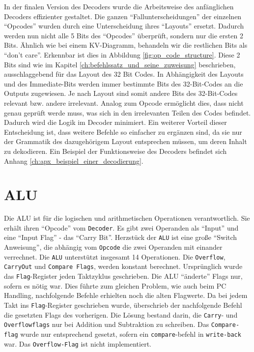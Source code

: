 \documentclass[paper=a4,fontsize=11pt,twocolumn]{scrreprt}
\begin{document}
In der finalen Version des Decoders wurde die Arbeitsweise des anfänglichen Decoders effizienter gestaltet.
Die ganzen \enquote{Fallunterscheidungen} der einzelnen \enquote{Opcodes} wurden durch eine Unterscheidung ihres \enquote{Layouts} ersetzt.
Dadurch werden nun nicht alle 5 Bits des \enquote{Opcodes} überprüft, sondern nur die ersten 2 Bits.
Ähnlich wie bei einem KV-Diagramm, behandeln wir die restlichen Bits als \enquote{don't care}.
Erkennbar ist dies in Abbildung \ref{fig:op_code_structure}.
Diese 2 Bits sind wie im Kapitel \ref{ch:befehlssatz_und_seine_zuweisung} beschrieben, ausschlaggebend für das Layout des 32 Bit Codes.
In Abhängigkeit des Layouts und des Immediate-Bits werden immer bestimmte Bits des 32-Bit-Codes an die Outputs zugewiesen.
Je nach Layout sind somit andere Bits des 32-Bit-Codes relevant bzw. andere irrelevant.
Analog zum Opcode ermöglicht dies, dass nicht genau geprüft werde muss, was sich in den irrelevanten Teilen des Codes befindet.
Dadurch wird die Logik im Decoder minimiert. 
Ein weiterer Vorteil dieser Entscheidung ist, dass weitere Befehle so einfacher zu ergänzen sind, da sie nur der Grammatik des dazugehörigem Layout entsprechen müssen, um deren Inhalt zu dekodieren.
Ein Beispiel der Funktionsweise des Decoders befindet sich Anhang \ref{ch:apx_beispiel_einer_decodierung}.

\section{ALU}
\label{sec:alu}

Die ALU ist für die logischen und arithmetischen Operationen verantwortlich.
Sie erhält ihren \enquote{Opcode} vom \texttt{Decoder}.
Es gibt zwei Operanden als \enquote{Input} und eine \enquote{Input Flag} - das \enquote{Carry Bit}.
Herzstück der \texttt{ALU} ist eine große \enquote{Switch Anweisung}, die abhängig vom \texttt{Opcode} die zwei Operanden mit einander verrechnet.
Die \texttt{ALU} unterstützt insgesamt 14 Operationen.
Die \texttt{Overflow}, \texttt{CarryOut} und \texttt{Compare Flags}, werden konstant berechnet.
Ursprünglich wurde das \texttt{Flag}-Register jeden Taktzyklus geschrieben.
Die ALU \enquote{änderte} Flags nur, sofern es nötig war.
Dies führte zum gleichen Problem, wie auch beim PC Handling, nachfolgende Befehle erhielten noch die alten Flagwerte.
Da bei jedem Takt ins \texttt{Flag}-Register geschrieben wurde, überschrieb der nachfolgende Befehl die gesetzten Flags des vorherigen.
Die Lösung bestand darin, die \texttt{Carry}- und \texttt{Overflowflags} nur bei Addition und Subtraktion zu schreiben.
Das \texttt{Compare-flag} wurde nur entsprechend gesetzt, sofern ein \texttt{compare}-befehl in \texttt{write-back} war.
Das \texttt{Overflow-Flag} ist nicht implementiert.
\end{document}

